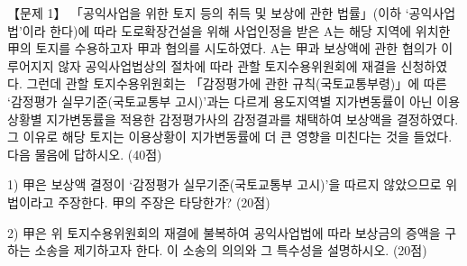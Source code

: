 \begin{longquestion}{【문제 1】}
「공익사업을 위한 토지 등의 취득 및 보상에 관한 법률」(이하 ‘공익사업법’이라 한다)에 따라 도로확장건설을 위해 사업인정을 받은 A는 해당 지역에 위치한 甲의 토지를 수용하고자 甲과 협의를 시도하였다. A는 甲과 보상액에 관한 협의가 이루어지지 않자 공익사업법상의 절차에 따라 관할 토지수용위원회에 재결을 신청하였다. 그런데 관할 토지수용위원회는 「감정평가에 관한 규칙(국토교통부령)」에 따른 ‘감정평가 실무기준(국토교통부 고시)’과는 다르게 용도지역별 지가변동률이 아닌 이용상황별 지가변동률을 적용한 감정평가사의 감정결과를 채택하여 보상액을 결정하였다. 그 이유로 해당 토지는 이용상황이 지가변동률에 더 큰 영향을 미친다는 것을 들었다. 다음 물음에 답하시오. (40점) \par
1) 甲은 보상액 결정이 ‘감정평가 실무기준(국토교통부 고시)’을 따르지 않았으므로 위법이라고 주장한다. 甲의 주장은 타당한가? (20점) \par
2) 甲은 위 토지수용위원회의 재결에 불복하여 공익사업법에 따라 보상금의 증액을 구하는 소송을 제기하고자 한다. 이 소송의 의의와 그 특수성을 설명하시오. (20점) \par
\end{longquestion}
